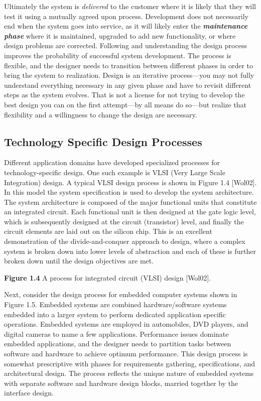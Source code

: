 \documentclass[a4paper,10pt]{book}
\begin{document}
Ultimately the system is \emph{delivered} to the customer where it is
likely that they will test it using a mutually agreed upon process.
Development does not necessarily end when the system goes into service,
as it will likely enter the \emph{\textbf{maintenance phase}} where it
is maintained, upgraded to add new functionality, or where design
problems are corrected. Following and understanding the design process
improves the probability of successful system development. The process
is flexible, and the designer needs to transition between different
phases in order to bring the system to realization. Design is an
iterative process---you may not fully understand everything necessary in
any given phase and have to revisit different steps as the system
evolves. That is not a license for not trying to develop the best design
you can on the first attempt---by all means do so---but realize that
flexibility and a willingness to change the design are necessary.

\subsection{Technology Specific Design Processes}

Different application domains have developed specialized processes for
technology-specific design. One such example is VLSI (Very Large Scale
Integration) design. A typical VLSI design process is shown in Figure
1.4 {[}Wol02{]}. In this model the system specification is used to
develop the system architecture. The system architecture is composed of
the major functional units that constitute an integrated circuit. Each
functional unit is then designed at the gate logic level, which is
subsequently designed at the circuit (transistor) level, and finally the
circuit elements are laid out on the silicon chip. This is an excellent
demonstration of the divide-and-conquer approach to design, where a
complex system is broken down into lower levels of abstraction and each
of these is further broken down until the design objectives are met.


\textbf{Figure 1.4} A process for integrated circuit (VLSI) design
{[}Wol02{]}.

Next, consider the design process for embedded computer systems shown in
Figure 1.5. Embedded systems are combined hardware/software systems
embedded into a larger system to perform dedicated application specific
operations. Embedded systems are employed in automobiles, DVD players,
and digital cameras to name a few applications. Performance issues
dominate embedded applications, and the designer needs to partition
tasks between software and hardware to achieve optimum performance. This
design process is somewhat prescriptive with phases for requirements
gathering, specifications, and architectural design. The process
reflects the unique nature of embedded systems with separate software
and hardware design blocks, married together by the interface design.
\end{document}
